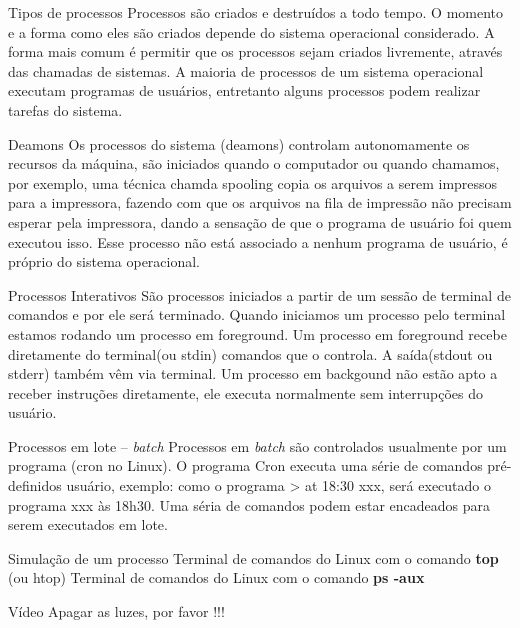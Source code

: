 \documentclass[11pt]{beamer}
\begin{document}
\begin{frame}{Tipos de processos}
 Processos são criados e destruídos a todo tempo. O momento e a forma como eles são criados depende do sistema operacional considerado.
 A forma mais comum é permitir que os processos sejam criados livremente, através das chamadas de sistemas.
 A maioria de processos de um sistema operacional executam programas de usuários, entretanto alguns processos podem realizar tarefas do sistema.
\end{frame}

\begin{frame}{Deamons}
 Os processos do sistema (deamons) controlam autonomamente os recursos da máquina, são iniciados quando o computador ou quando chamamos, por exemplo, uma técnica chamda spooling copia os arquivos a serem impressos para a impressora, fazendo com que os arquivos na fila de impressão não precisam esperar pela impressora, dando a sensação de que o programa de usuário foi quem executou isso. Esse processo não está associado a nenhum programa de usuário, é próprio do sistema operacional.
\end{frame}

\begin{frame}{Processos Interativos}
 São processos iniciados a partir de um sessão de terminal de comandos e por ele será terminado.
 Quando iniciamos um processo pelo terminal estamos rodando um processo em foreground.
 Um processo em foreground recebe diretamente do terminal(ou stdin) comandos que o controla.
 A saída(stdout ou stderr) também vêm via terminal.
 Um processo em backgound não estão apto a receber instruções diretamente, ele executa normalmente sem interrupções do usuário.
\end{frame}

\begin{frame}{Processos em lote -- \textit{batch}}
 Processos em \textit{batch} são controlados usualmente por um programa (cron no Linux). O programa Cron executa uma série de comandos pré-definidos usuário, exemplo: como o programa > at 18:30 xxx, será executado o programa xxx às 18h30. Uma séria de comandos podem estar encadeados para serem executados em lote.
\end{frame}


\begin{frame}{Simulação de um processo}
 Terminal de comandos do Linux com o comando \textbf{top} (ou htop) 
 Terminal de comandos do Linux com o comando \textbf{ps -aux}
\end{frame}

\begin{frame}{Vídeo}
 Apagar as luzes, por favor !!!
\end{frame}
\end{document}
